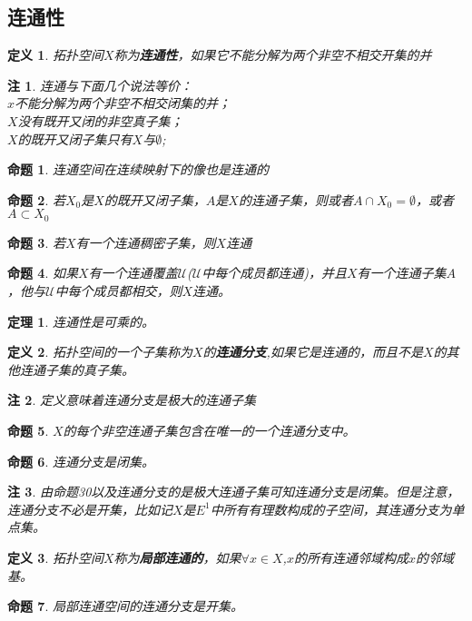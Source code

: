 \documentclass[UTF8]{ctexart}
\newtheorem{dfnt}{定义}
\newtheorem{thr}{定理}
\newtheorem*{note}{注}
\newtheorem{pro}{命题}
\begin{document}
\subsection{连通性}
\begin{dfnt}
拓扑空间$X$称为\textbf{连通性}，如果它不能分解为两个非空不相交开集的并
\end{dfnt}
\begin{note}
连通与下面几个说法等价：\\$x$不能分解为两个非空不相交闭集的并；\\$X$没有既开又闭的非空真子集；\\$X$的既开又闭子集只有$X$与$\emptyset$;
\end{note}
\begin{pro}
连通空间在连续映射下的像也是连通的
\end{pro}
\begin{pro}
若$X_0$是$X$的既开又闭子集，$A$是$X$的连通子集，则或者$A \cap X_0 = \emptyset$，或者$A \subset X_0$
\end{pro}
\begin{pro}
若$X$有一个连通稠密子集，则$X$连通
\end{pro}
\begin{pro}
如果$X$有一个连通覆盖$\mathscr{U}$($\mathscr{U}$中每个成员都连通)，并且$X$有一个连通子集$A$，他与$\mathscr{U}$中每个成员都相交，则$X$连通。
\end{pro}
\begin{thr}
连通性是可乘的。
\end{thr}
\begin{dfnt}
拓扑空间的一个子集称为$X$的\textbf{连通分支},如果它是连通的，而且不是$X$的其他连通子集的真子集。
\end{dfnt}
\begin{note}
定义意味着连通分支是极大的连通子集
\end{note}
\begin{pro}
$X$的每个非空连通子集包含在唯一的一个连通分支中。
\end{pro}
\begin{pro}
连通分支是闭集。
\end{pro}
\begin{note}
由命题30以及连通分支的是极大连通子集可知连通分支是闭集。但是注意，连通分支不必是开集，比如记$X$是$E^1$中所有有理数构成的子空间，其连通分支为单点集。
\end{note}
\begin{dfnt}
拓扑空间$X$称为\textbf{局部连通的}，如果$\forall x \in X$,$x$的所有连通邻域构成$x$的邻域基。
\end{dfnt}
\begin{pro}
局部连通空间的连通分支是开集。
\end{pro}
\end{document}
